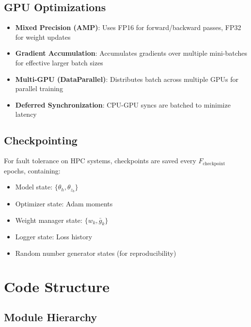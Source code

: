 \documentclass[11pt,a4paper]{article}
\begin{document}
\subsection{GPU Optimizations}

\begin{itemize}
    \item \textbf{Mixed Precision (AMP)}: Uses FP16 for forward/backward passes, FP32 for weight updates
    \item \textbf{Gradient Accumulation}: Accumulates gradients over multiple mini-batches for effective larger batch sizes
    \item \textbf{Multi-GPU (DataParallel)}: Distributes batch across multiple GPUs for parallel training
    \item \textbf{Deferred Synchronization}: CPU-GPU syncs are batched to minimize latency
\end{itemize}

\subsection{Checkpointing}

For fault tolerance on HPC systems, checkpoints are saved every $F_{\text{checkpoint}}$ epochs, containing:
\begin{itemize}
    \item Model state: $\{\theta_h, \theta_{z_b}\}$
    \item Optimizer state: Adam moments
    \item Weight manager state: $\{w_k, \bar{g}_k\}$
    \item Logger state: Loss history
    \item Random number generator states (for reproducibility)
\end{itemize}

\section{Code Structure}

\subsection{Module Hierarchy}
\end{document}
